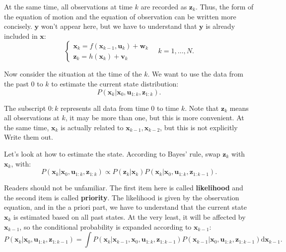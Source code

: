 At the same time, all observations at time $k$ are recorded as $\bm{z}_k$. Thus, the form of the equation of motion and the equation of observation can be written more concisely. $\bm{y}$ won't appear here, but we have to understand that $\bm{y}$ is already included in $\bm{x}$:
\begin{equation}
\left\{ \begin{array}{l}
{\bm{x}_k} = f\left( {{\bm{x}_{k - 1}},{\bm{u}_k}} \right) + \bm{w}_k \\
{\bm{z}_{k}} = h\left( \bm{x}_k  \right)+ \bm{v}_{k}
\end{array} \right. \quad k=1, \ldots, N .
\end{equation}

Now consider the situation at the time of the $k$. We want to use the data from the past $0$ to $k$ to estimate the current state distribution:
\begin{equation}
P(\bm{x}_k | \bm{x}_0, \bm{u}_{1:k}, \bm{z}_{1:k}).
\end{equation}

The subscript $0:k$ represents all data from time $0$ to time $k$. Note that $\bm{z}_k$ means all observations at $k$, it may be more than one, but this is more convenient. At the same time, $\bm{x}_k$ is actually related to $\bm{x}_{k-1}, \bm{x}_{k-2}$, but this is not explicitly Write them out.

Let's look at how to estimate the state. According to Bayes' rule, swap $\bm{z}_k$ with $\bm{x}_k$, with:
\begin{equation}
\label{eq:10-5}
P\left( {{\bm{x}_k}|{\bm{x}_0},{\bm{u}_{1:k}},{\bm{z}_{1:k}}} \right) \propto P\left( {{\bm{z}_k}|{\bm{x}_k}} \right) P\left( {{\bm{x}_k}|{\bm{x}_0},{\bm{u}_{1:k}},{\bm{z}_{1:k - 1}}} \right).
\end{equation}

Readers should not be unfamiliar. The first item here is called \textbf{likelihood} and the second item is called \textbf{priority}. The likelihood is given by the observation equation, and in the a priori part, we have to understand that the current state $\bm{x}_k$ is estimated based on all past states. At the very least, it will be affected by $\bm{x}_{k-1}$, so the conditional probability is expanded according to $\bm{x}_{k-1}$:
\begin{equation}
\label{eq:bayes-estimator}
P\left( {{\bm{x}_k}|{\bm{x}_0},{\bm{u}_{1:k}},{\bm{z}_{1:k - 1}}} \right) = \int {P\left( {{\bm{x}_k}|{\bm{x}_{k - 1}},{\bm{x}_0},{\bm{u}_{1:k}},{\bm{z}_{1:k - 1}}} \right)P\left( {{\bm{x}_{k - 1}}|{\bm{x}_0},{\bm{u}_{1:k}},{\bm{z}_{1:k - 1}}} \right) \mathrm{d}\bm{x}_{k-1} }.
\end{equation}

